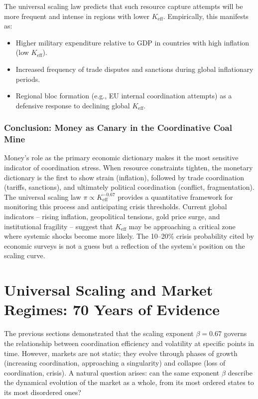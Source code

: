 \documentclass[11pt,a4paper]{article}
\theoremstyle{remark}
\begin{document}
	The universal scaling law predicts that such resource capture attempts will be more frequent and intense in regions with lower \(K_{\text{eff}}\). Empirically, this manifests as:
	\begin{itemize}
		\item Higher military expenditure relative to GDP in countries with high inflation (low \(K_{\text{eff}}\)).
		\item Increased frequency of trade disputes and sanctions during global inflationary periods.
		\item Regional bloc formation (e.g., EU internal coordination attempts) as a defensive response to declining global \(K_{\text{eff}}\).
	\end{itemize}
	
	\subsubsection{Conclusion: Money as Canary in the Coordinative Coal Mine}
	Money's role as the primary economic dictionary makes it the most sensitive indicator of coordination stress. When resource constraints tighten, the monetary dictionary is the first to show strain (inflation), followed by trade coordination (tariffs, sanctions), and ultimately political coordination (conflict, fragmentation). The universal scaling law \(\pi \propto K_{\text{eff}}^{-0.67}\) provides a quantitative framework for monitoring this process and anticipating crisis thresholds. Current global indicators – rising inflation, geopolitical tensions, gold price surge, and institutional fragility – suggest that \(K_{\text{eff}}\) may be approaching a critical zone where systemic shocks become more likely. The 10–20\% crisis probability cited by economic surveys is not a guess but a reflection of the system's position on the scaling curve.
	
\section{Universal Scaling and Market Regimes: 70 Years of Evidence}
\label{sec:multifractal}

The previous sections demonstrated that the scaling exponent \(\beta = 0.67\) governs the relationship between coordination efficiency and volatility at specific points in time. However, markets are not static; they evolve through phases of growth (increasing coordination, approaching a singularity) and collapse (loss of coordination, crisis). A natural question arises: can the same exponent \(\beta\) describe the dynamical evolution of the market as a whole, from its most ordered states to its most disordered ones?
\end{document}
